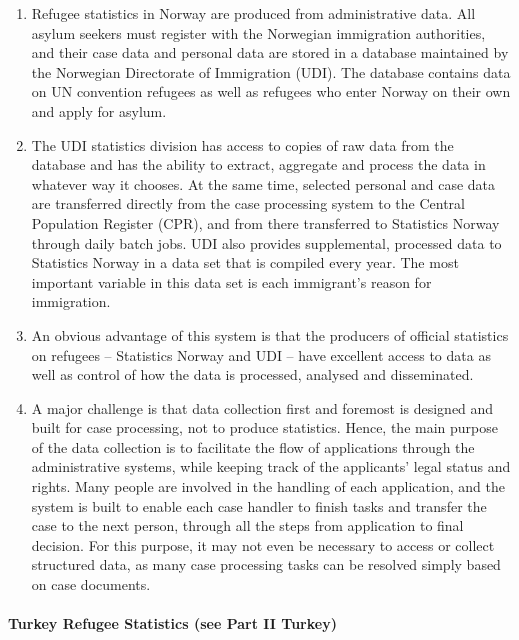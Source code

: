 \documentclass[
]{article}
\begin{document}
\begin{enumerate}
\def\labelenumi{\arabic{enumi}.}
\setcounter{enumi}{162}
\item
  Refugee statistics in Norway are produced from administrative data.
  All asylum seekers must register with the Norwegian immigration
  authorities, and their case data and personal data are stored in a
  database maintained by the Norwegian Directorate of Immigration
  (UDI). The database contains data on UN convention refugees as well
  as refugees who enter Norway on their own and apply for asylum.
\item
  The UDI statistics division has access to copies of raw data from
  the database and has the ability to extract, aggregate and process
  the data in whatever way it chooses. At the same time, selected
  personal and case data are transferred directly from the case
  processing system to the Central Population Register (CPR), and from
  there transferred to Statistics Norway through daily batch jobs. UDI
  also provides supplemental, processed data to Statistics Norway in a
  data set that is compiled every year. The most important variable in
  this data set is each immigrant's reason for immigration.
\item
  An obvious {advantage} of this system is that the
  producers of official statistics on refugees -- Statistics Norway
  and UDI -- have excellent access to data as well as control of how
  the data is processed, analysed and disseminated.
\item
  A major {challenge} is that data collection first and
  foremost is designed and built for case processing, not to produce
  statistics. Hence, the main purpose of the data collection is to
  facilitate the flow of applications through the administrative
  systems, while keeping track of the applicants' legal status and
  rights. Many people are involved in the handling of each
  application, and the system is built to enable each case handler to
  finish tasks and transfer the case to the next person, through all
  the steps from application to final decision. For this purpose, it
  may not even be necessary to access or collect structured data, as
  many case processing tasks can be resolved simply based on case
  documents.
\end{enumerate}

\hypertarget{turkey-refugee-statistics-see-part-ii-turkey-1}{%
\paragraph{Turkey Refugee Statistics (see Part II Turkey)}\label{turkey-refugee-statistics-see-part-ii-turkey-1}}
\end{document}
